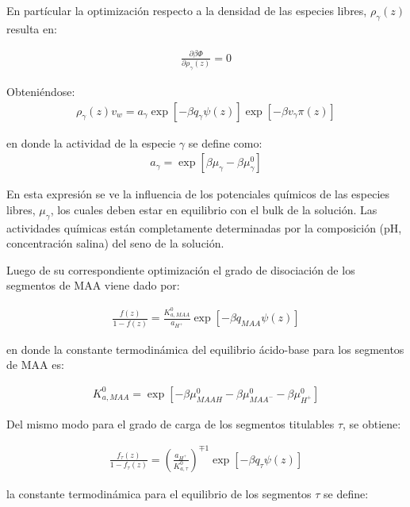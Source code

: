 En part\'icular la optimizaci\'on respecto a la densidad de las especies libres, $\rho_\gamma (z)$ resulta en:

\begin{align}
	\frac{\partial\beta\Phi}{\partial\rho_\gamma(z)} = 0
\end{align}

Obteni\'endose:
\begin{align}
	\rho_\gamma(z)v_w = a_\gamma \exp\left[-\beta q_\gamma\psi(z)\right] \exp\left[-\beta v_\gamma\pi(z)\right]
	\label{eq:film:free-species}
\end{align}

\noindent en donde la actividad de la especie $\gamma$ se define como:
\begin{align}
	a_\gamma = \exp[\beta\mu_\gamma - \beta\mu^0_\gamma]
\end{align}

En esta expresi\'on se ve la influencia de los potenciales qu\'imicos de las especies libres,  $\mu_\gamma$, los cuales  deben estar en equilibrio con el bulk de la soluci\'on. Las actividades qu\'imicas est\'an completamente determinadas por la composici\'on (pH, concentraci\'on salina) del seno de la soluci\'on.
 
Luego de su correspondiente optimizaci\'on el grado de disociaci\'on de los segmentos de MAA viene dado por:

\begin{align}
	\frac{f(z)}{1-f(z)} = \frac{K^0_{a,MAA}}{a_{H^+}} \exp[-\beta q_{MAA}\psi(z)]
	\label{eq:film:degree-film}
\end{align}

\noindent en donde la constante termodin\'amica del equilibrio \'acido-base para los segmentos de MAA es:

\begin{align}
	K_{a,MAA}^0 = \exp[-\beta\mu^0_{MAAH} -\beta\mu^0_{MAA^-} -\beta\mu^0_{H^+}]
	\label{eq:film:ka-acido-base}
\end{align}

Del mismo modo para el grado de carga de los segmentos titulables $\tau$, se obtiene:

\begin{align}
	\frac{f_\tau(z)}{1-f_\tau(z)} = \left(\frac{a_{H^+}}{K^0_{a,\tau}}\right)^{\mp 1} \exp[-\beta q_\tau \psi(z)]
	\label{eq:film:degree-protein}
\end{align}


\noindent la constante termodin\'amica para el equilibrio de los segmentos $\tau$ se define:

